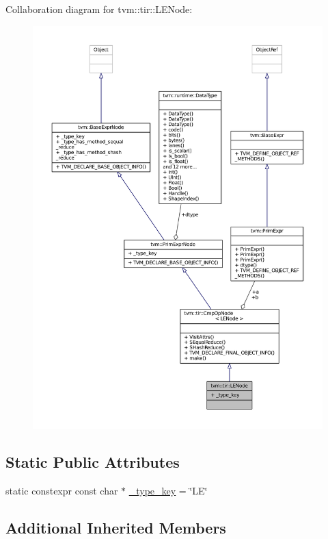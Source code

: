 Collaboration diagram for tvm\+:\+:tir\+:\+:L\+E\+Node\+:
\nopagebreak
\begin{figure}[H]
\begin{center}
\leavevmode
\includegraphics[width=350pt]{structtvm_1_1tir_1_1LENode__coll__graph}
\end{center}
\end{figure}
\subsection*{Static Public Attributes}
\begin{DoxyCompactItemize}
\item 
static constexpr const char $\ast$ \hyperlink{structtvm_1_1tir_1_1LENode_a909407e7db707f867951ae12841d63d7}{\+\_\+type\+\_\+key} = \char`\"{}LE\char`\"{}
\end{DoxyCompactItemize}
\subsection*{Additional Inherited Members}


